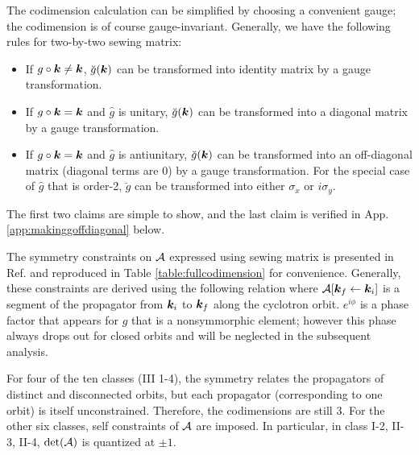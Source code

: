 \documentclass[aps, showpacs, twocolumn, notitlepage, superscriptaddress]{revtex4-1}
\begin{document}
The codimension calculation can be  simplified by choosing a convenient gauge; the codimension is of course gauge-invariant. Generally, we have the following rules for two-by-two sewing matrix:
\begin{itemize}
\item If $g\circ\boldsymbol{k}\ne\boldsymbol{k}$, $\breve{g}(\boldsymbol{k})$ can be transformed into identity matrix by a gauge transformation.
\item If $g\circ\boldsymbol{k}=\boldsymbol{k}$ and $\hat{g}$ is unitary, $\breve{g}(\boldsymbol{k})$ can be transformed into a diagonal matrix by a gauge transformation.
\item If $g\circ\boldsymbol{k}=\boldsymbol{k}$ and $\hat{g}$ is antiunitary, $\breve{g}(\boldsymbol{k})$ can be transformed into an off-diagonal matrix (diagonal terms are 0) by a gauge transformation.  For the special case of $\hat{g}$ that is order-2, $\breve{g}$ can be transformed into either $\sigma_x$  or $i\sigma_y$.
\end{itemize}
The first two claims are simple to show, and the last claim is verified  in App. \ref{app:makinggoffdiagonal} below.

The symmetry constraints on ${\cal A}$ expressed using sewing matrix is presented in Ref.  and reproduced in Table \ref{table:fullcodimension} for convenience. Generally, these constraints are derived using the following relation
where ${\cal A}[\boldsymbol{k}_f\leftarrow \boldsymbol{k}_i]$ is a segment of the propagator from $\boldsymbol{k}_i$ to $\boldsymbol{k}_f$ along the cyclotron orbit. $e^{i\phi}$ is a phase factor that appears for $g$ that is a nonsymmorphic element; however this phase always drops out\cite{100p} for closed orbits and will be neglected in the subsequent analysis.

For four of  the ten classes (III 1-4), the symmetry relates the propagators of distinct and disconnected orbits, but each propagator (corresponding to one orbit) is itself unconstrained.  Therefore, the codimensions are still 3. For the other six classes, self constraints of ${\cal A}$ are imposed. In particular, in class I-2, II-3, II-4, $\det({\cal A})$ is quantized at $\pm 1$\cite{topoferm,100p}.
\end{document}
